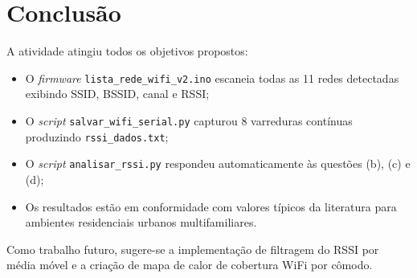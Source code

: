\documentclass[
  12pt,
  a4paper,
  oneside,
  brazil,
  chapter=TITLE,
  section=TITLE,
]{abntex2}
\begin{document}
\chapter{Conclusão}

A atividade atingiu todos os objetivos propostos:

\begin{itemize}
  \item O \textit{firmware} \texttt{lista\_rede\_wifi\_v2.ino} escaneia todas
        as 11 redes detectadas exibindo SSID, BSSID, canal e RSSI;
  \item O \textit{script} \texttt{salvar\_wifi\_serial.py} capturou
        8 varreduras contínuas produzindo \texttt{rssi\_dados.txt};
  \item O \textit{script} \texttt{analisar\_rssi.py} respondeu automaticamente
        às questões (b), (c) e (d);
  \item Os resultados estão em conformidade com valores típicos da literatura
        para ambientes residenciais urbanos multifamiliares.
\end{itemize}

Como trabalho futuro, sugere-se a implementação de filtragem do RSSI por
média móvel e a criação de mapa de calor de cobertura WiFi por cômodo.

\postextual


\end{document}
